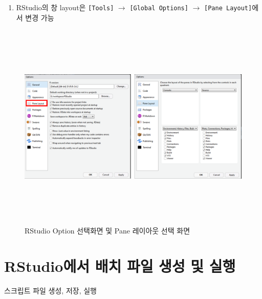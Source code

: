 \documentclass[12pt,a4paper]{book}
\providecommand{\tightlist}{%
  \setlength{\itemsep}{0pt}\setlength{\parskip}{0pt}}
\theoremstyle{definition}
\theoremstyle{definition}
\theoremstyle{definition}
\theoremstyle{remark}
\begin{document}
\begin{enumerate}
\def\labelenumi{\arabic{enumi}.}
\setcounter{enumi}{4}
\tightlist
\item
  RStudio의 창 layout은 \texttt{{[}Tools{]}} \(\rightarrow\)
  \texttt{{[}Global\ Options{]}} \(\rightarrow\)
  \texttt{{[}Pane\ Layout{]}}에서 변경 가능
\end{enumerate}

\begin{figure}[H] {
  \centering
  \includegraphics[width = 15cm, height = 10cm]{Figures/RStudio-layout.png}
  \caption[RStudio Option 선택화면 및 Pane 레이아웃 선택 화면]{RStudio Option 선택화면 및 Pane 레이아웃 선택 화면}\label{fig:Rstudio-layout}
} \end{figure}

\section{RStudio에서 배치 파일 생성 및 실행}\label{rstudio-----}

스크립트 파일 생성, 저장, 실행
\end{document}
